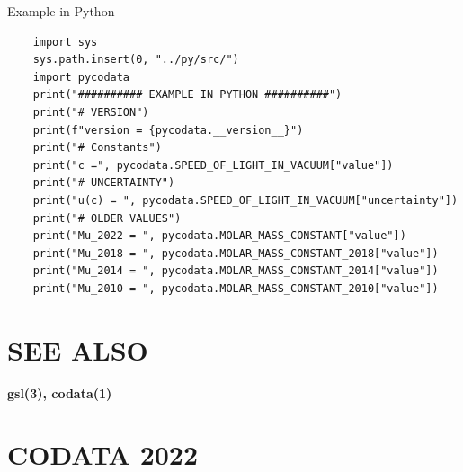 Example in Python

\begin{verbatim}
    import sys
    sys.path.insert(0, "../py/src/")
    import pycodata
    print("########## EXAMPLE IN PYTHON ##########")
    print("# VERSION")
    print(f"version = {pycodata.__version__}")
    print("# Constants")
    print("c =", pycodata.SPEED_OF_LIGHT_IN_VACUUM["value"])
    print("# UNCERTAINTY")
    print("u(c) = ", pycodata.SPEED_OF_LIGHT_IN_VACUUM["uncertainty"])
    print("# OLDER VALUES")
    print("Mu_2022 = ", pycodata.MOLAR_MASS_CONSTANT["value"])
    print("Mu_2018 = ", pycodata.MOLAR_MASS_CONSTANT_2018["value"])
    print("Mu_2014 = ", pycodata.MOLAR_MASS_CONSTANT_2014["value"])
    print("Mu_2010 = ", pycodata.MOLAR_MASS_CONSTANT_2010["value"])

\end{verbatim}

\section{SEE ALSO}

\textbf{gsl(3), codata(1)}

\section{CODATA 2022}

